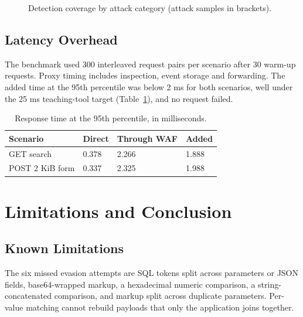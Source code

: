 \documentclass{FastFyp}
\begin{document}
\begin{figure}[!h]
\centering
{}
\caption{Detection coverage by attack category (attack samples in brackets).}
\label{fig:cov}
\end{figure}

\section{Latency Overhead}
The benchmark used 300 interleaved request pairs per scenario after 30 warm-up requests. Proxy timing includes inspection, event storage and forwarding. The added time at the 95th percentile was below 2 ms for both scenarios, well under the 25 ms teaching-tool target (Table~\ref{tab:latency}), and no request failed.

\begin{table}[!h]
\centering
\caption{Response time at the 95th percentile, in milliseconds.}
{\small\singlespacing\renewcommand{\arraystretch}{1.3}
\begin{tabular}{|p{4.2cm}|p{2.4cm}|p{2.9cm}|p{2.4cm}|}
\hline
\textbf{Scenario} & \textbf{Direct} & \textbf{Through WAF} & \textbf{Added} \\
\hline
GET search & 0.378 & 2.266 & 1.888 \\
\hline
POST 2 KiB form & 0.337 & 2.325 & 1.988 \\
\hline
\end{tabular}}
\label{tab:latency}
\end{table}

\chapter{Limitations and Conclusion}
\section{Known Limitations}
The six missed evasion attempts are SQL tokens split across parameters or JSON fields, base64-wrapped markup, a hexadecimal numeric comparison, a string-concatenated comparison, and markup split across duplicate parameters. Per-value matching cannot rebuild payloads that only the application joins together.
\end{document}
